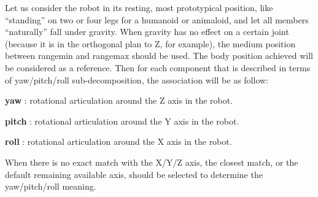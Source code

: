 \documentclass[a4paper]{article}
\begin{document}
Let us consider the robot in its resting, most prototypical position,
like “standing” on two or four legs for a humanoid or animaloid, and
let all members “naturally” fall under gravity. When gravity has no
effect on a certain joint (because it is in the orthogonal plan to Z,
for example), the medium position between rangemin and rangemax should
be used. The body position achieved will be considered as a reference.
Then for each component that is described in terms of yaw/pitch/roll
sub-decomposition, the association will be as follow:

{
\textbf{ yaw} : rotational articulation around the Z
axis in the robot.}


\textbf{ pitch} : rotational articulation around the Y axis in the
robot.


\textbf{ roll} : rotational articulation around the X axis in the
robot.


When there is no exact match with the X/Y/Z axis, the closest match, or
the default remaining available axis, should be selected to determine
the yaw/pitch/roll meaning.
\end{document}
